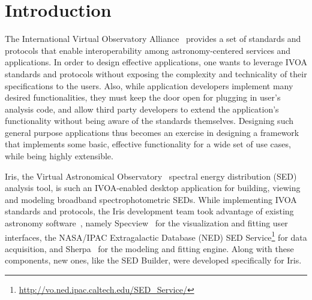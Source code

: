 \documentclass[final,5p,authoryear]{elsarticle}
\begin{document}
\label{sec:introduction} \section{Introduction} The International Virtual
Observatory Alliance~\citep[IVOA;][]{2004SPIE.5493..137Q} provides a set of
standards and protocols that enable interoperability among astronomy-center\-ed
services and applications. In order to design effective applications, one wants
to leverage IVOA standards and protocols without exposing the complexity and
technicality of their specifications to the users. Also, while application
developers implement many desired functionalities, they must keep the door open
for plugging in user's analysis code, and allow third party developers to extend
the application's functionality without being aware of the standards themselves.
Designing such general purpose applications thus becomes an exercise in
designing a framework that implements some basic, effective functionality for a
wide set of use cases, while being highly extensible.


Iris, the Virtual Astronomical Observatory~\citep[VAO;][]{2012SPIE.8449E..0HB}
spectral energy distribution (SED) analysis tool, is such an IVOA-enabled
desktop application for building, viewing and modeling broadband
spectrophotometric SEDs. While implementing IVOA standards and protocols, the
Iris development team took advantage of existing astronomy
software~\citep{2012ASPC..461..893D,2013AAS...22124038L}, namely
Specview~\citep{2002ASPC..281..120B} for the visualization and fitting user
interfaces, the NASA/IPAC Extragalactic Database (NED) SED Service\footnote{\url{http://vo.ned.ipac.caltech.edu/SED_Service/}} for data
acquisition, and Sherpa~\citep{2001SPIE.4477...76F} for the modeling and fitting
engine. Along with these components, new ones, like the SED Builder, were
developed specifically for Iris.


\end{document}
